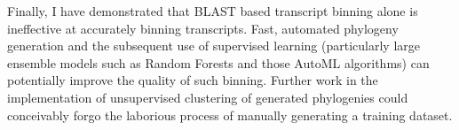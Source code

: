 Finally, I have demonstrated that BLAST based transcript binning alone is
ineffective at accurately binning transcripts. Fast, automated phylogeny generation
and the subsequent use of supervised learning (particularly
large ensemble models such as Random Forests and those AutoML algorithms)
can potentially improve the quality of such binning.  Further work 
in the implementation of unsupervised clustering of generated phylogenies
could conceivably forgo the laborious process of manually generating
a training dataset.